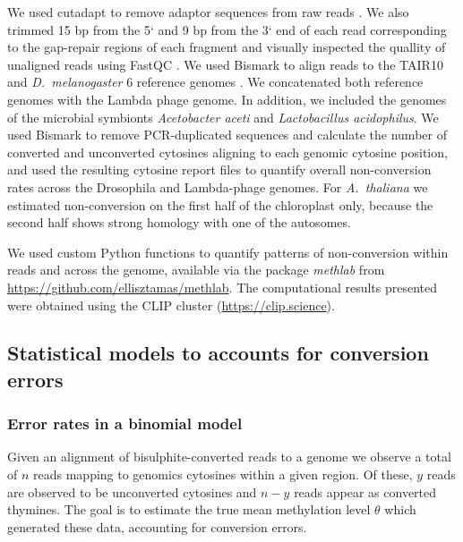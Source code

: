 \documentclass[10pt,letterpaper]{article}
\begin{document}
We used cutadapt to remove adaptor sequences from raw reads \cite{martin2011cutadapt}.
We also trimmed 15 bp from the 5` and 9 bp from the 3` end of each read corresponding to the gap-repair regions of each fragment and visually inspected the quallity of unaligned reads using FastQC \cite{andrews2020fastqc}.
We used Bismark to align reads to the TAIR10 and \textit{D.~melanogaster} 6 reference genomes \cite{krueger2011bismark}.
We concatenated both reference genomes with the Lambda phage genome.
In addition, we included the genomes of the microbial symbionts \textit{Acetobacter aceti} and \textit{Lactobacillus acidophilus}.
We used Bismark to remove PCR-duplicated sequences and calculate the number of converted and unconverted cytosines aligning to each genomic cytosine position, and used the resulting cytosine report files to quantify overall non-conversion rates across the Drosophila and Lambda-phage genomes.
For \emph{A.~thaliana} we estimated non-conversion on the first half of the chloroplast only, because the second half shows strong homology with one of the autosomes.

We used custom Python functions to quantify patterns of non-conversion within reads and across the genome, available via the package \textit{methlab} from \url{https://github.com/ellisztamas/methlab}.
The computational results presented were obtained using the CLIP cluster (\url{https://clip.science}).

\subsection*{Statistical models to accounts for conversion errors}

\subsubsection*{Error rates in a binomial model} \label{sec:binomial-with-errors}

Given an alignment of bisulphite-converted reads to a genome we observe a total of $n$ reads mapping to genomics cytosines within a given region.
Of these, $y$ reads are observed to be unconverted cytosines and $n-y$ reads appear as converted thymines.
The goal is to estimate the true mean methylation level $\theta$ which generated these data, accounting for conversion errors.
\end{document}
